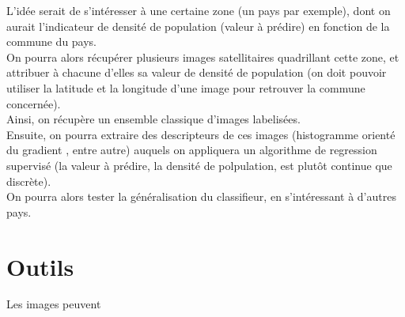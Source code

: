 \documentclass{book}
\begin{document}
L'idée serait de s'intéresser à une certaine zone (un pays par exemple), dont on aurait l'indicateur de densité de population (valeur 
à prédire) en fonction de la commune du pays.\\
On pourra alors récupérer plusieurs images satellitaires quadrillant cette zone, et attribuer à chacune d'elles
sa valeur de densité de population (on doit pouvoir utiliser la latitude et la longitude d'une image pour retrouver la commune concernée).\\
Ainsi, on récupère un ensemble classique d'images labelisées.\\
Ensuite, on pourra extraire des descripteurs de ces images (histogramme orienté du gradient \cite{Dalal05histogramsof}, entre autre)
auquels on appliquera un algorithme de regression supervisé (la valeur à prédire, la densité de
polpulation, est plut\^{o}t continue que discrète).\\
On pourra alors tester la généralisation du classifieur, en s'intéressant à d'autres pays.\\

\chapter{Outils}

Les images peuvent 

\clearpage

\backmatter

\listoftables

\listoffigures



\end{document}

